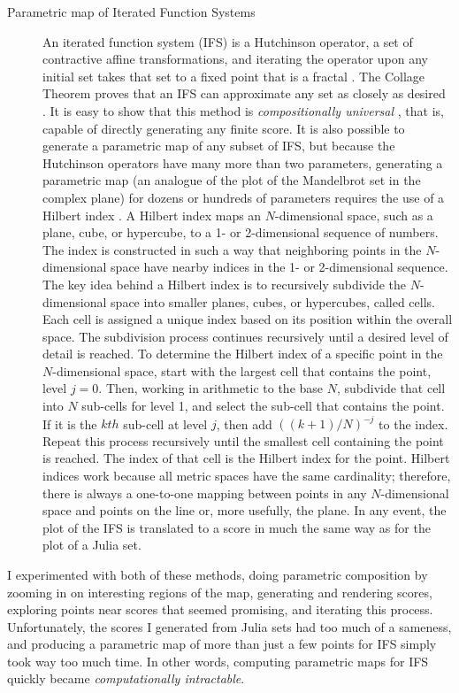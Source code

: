 \documentclass[11pt]{scrartcl}
\begin{document}
\begin{description}
\item[Parametric map of Iterated Function Systems] An iterated function system (IFS) is a Hutchinson operator, a set of contractive affine transformations, and iterating the operator upon any initial set takes that set to a fixed point that is a fractal \parencite{barnsley1985iterated, barnsley1993}. The Collage Theorem proves that an IFS can approximate any set as closely as desired \parencite{barnsley1989fractal, barnsley1993}. It is easy to show that this method is \emph{compositionally universal} \parencite{obsessed, gogins2023scoregraphs}, that is, capable of directly generating any finite score. It is also possible to generate a parametric map of any subset of IFS, but because the Hutchinson operators have many more than two parameters, generating a parametric map (an analogue of the plot of the Mandelbrot set in the complex plane) for dozens or hundreds of parameters requires the use of a Hilbert index \parencite{patrick1968mapping}. A Hilbert index maps an $N$-dimensional space, such as a plane, cube, or hypercube, to a 1- or 2-dimensional sequence of numbers. The index is constructed in such a way that neighboring points in the $N$-dimensional space have nearby indices in the 1- or 2-dimensional sequence. The key idea behind a Hilbert index is to recursively subdivide the $N$-dimensional space into smaller planes, cubes, or hypercubes, called cells. Each cell is assigned a unique index based on its position within the overall space. The subdivision process continues recursively until a desired level of detail is reached. To determine the Hilbert index of a specific point in the $N$-dimensional space, start with the largest cell that contains the point, level $j = 0$. Then, working in arithmetic to the base $N$, subdivide that cell into $N$ sub-cells for level 1, and select the sub-cell that contains the point. If it is the $kth$ sub-cell at level $j$, then add $((k + 1)/N)^{-j}$ to the index. Repeat this process recursively until the smallest cell containing the point is reached. The index of that cell is  the Hilbert index for the point. Hilbert indices work because all metric spaces have the same cardinality; therefore, there is always a one-to-one mapping between points in any $N$-dimensional space and points on the line or, more usefully, the plane. In any event, the plot of the IFS is translated to a score in much the same way as for the plot of a Julia set.
\end{description}

\noindent I experimented with both of these methods, doing parametric composition by zooming in on interesting regions of the map, generating and rendering scores, exploring points near scores that seemed promising, and iterating this process. Unfortunately, the scores I generated from Julia sets had too much of a sameness, and producing a parametric map of more than just a few points for IFS simply took way too much time. In other words, computing parametric maps for IFS quickly became \emph{computationally intractable}. 
\end{document}
